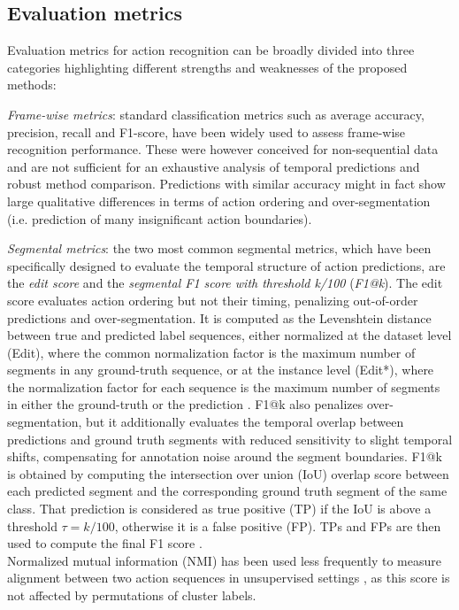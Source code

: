 \documentclass[journal]{IEEEtran}
\begin{document}
\subsection{Evaluation metrics} \label{Evaluation metrics}

Evaluation metrics for action recognition can be broadly divided into three categories highlighting different strengths and weaknesses of the proposed methods: 

\vspace{0.2 cm}
\textit{Frame-wise metrics}: standard classification metrics such as average accuracy, precision, recall and F1-score, have been widely used to assess frame-wise recognition performance. 
These were however conceived for non-sequential data and are not sufficient for an exhaustive analysis of temporal predictions and robust method comparison. 
Predictions with similar accuracy might in fact show large qualitative differences in terms of action ordering and over-segmentation (i.e. prediction of many insignificant action boundaries). 

\vspace{0.2 cm}
\textit{Segmental metrics}: 
the two most common segmental metrics, which have been specifically designed to evaluate the temporal structure of action predictions, are the \textit{edit score} and the \textit{segmental F1 score with threshold k/100} (\textit{F1@k}). 
The edit score evaluates action ordering but not their timing, penalizing out-of-order predictions and over-segmentation. It is computed as the Levenshtein distance between true and predicted label sequences, either normalized at the dataset level (Edit), where the common normalization factor is the maximum number of segments in any ground-truth sequence, or at the instance level (Edit*), where the normalization factor for each sequence is the maximum number of segments in either the ground-truth or the prediction \cite{Lea2016}.
F1@k also penalizes over-segmentation, but it additionally evaluates the temporal overlap between predictions and ground truth segments with reduced sensitivity to slight temporal shifts, compensating for annotation noise around the segment boundaries. 
F1@k is obtained by computing the intersection over union (IoU) overlap score between each predicted segment and the corresponding ground truth segment of the same class. That prediction is considered as true positive (TP) if the IoU is above a threshold $\tau = k/100$, otherwise it is a false positive (FP). TPs and FPs are then used to compute the final F1 score \cite{Lea2017tcnCVPR}.\\
Normalized mutual information (NMI) has been used less frequently to measure alignment between two action sequences in unsupervised settings \cite{Murali2016}, as this score is not affected by permutations of cluster labels. 
\end{document}
